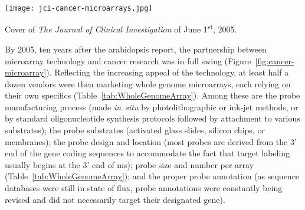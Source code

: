 
\begin{marginfigure}%
  \texttt{[image: jci-cancer-microarrays.jpg]}
  \caption{Cover of \emph{The Journal of Clinical Investigation} of June
    1\textsuperscript{st}, 2005.}
  \label{fig:cancer-microarray}
\end{marginfigure}

By 2005, ten years after the arabidopsis report, the partnership between
microarray technology and cancer research was in full swing
(Figure~\ref{fig:cancer-microarray}).  Reflecting the increasing appeal of the
technology, at least half a dozen vendors were then marketing whole genome
microarrays, each relying on their own specifics
(Table~\ref{tab:WholeGenomeArray}).  Among these are the probe manufacturing
process (made \mbox{\emph{in situ}} by photolithographic or ink-jet methods, or
by standard oligonucleotide synthesis protocols followed by attachment to
various substrates); the probe substrates (activated glass slides, silicon
chips, or membranes); the probe design and location (most probes are derived
from the 3' end of the gene coding sequences to accommodate the fact that target
labeling usually begins at the 3' end of ms); probe size and
number per array (Table~\ref{tab:WholeGenomeArray}); and the proper probe
annotation (as sequence databases were still in state of flux, probe annotations
were constantly being revised and did not necessarily target their designated
gene).\cite{kawasaki_end_2006}


